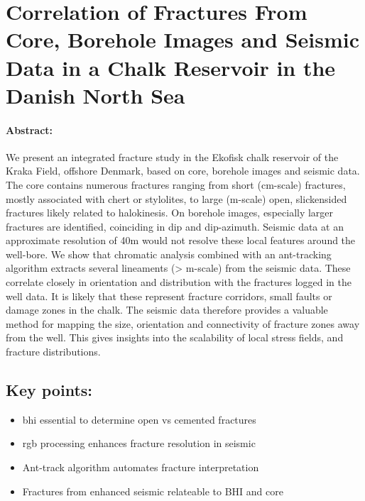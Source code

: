 \section{Correlation of Fractures From Core, Borehole Images and Seismic Data in a Chalk Reservoir in the Danish North Sea}
\label{sec:talaEAGE}
\paragraph{Abstract:} We present an integrated fracture study in the Ekofisk chalk reservoir of the Kraka Field, offshore Denmark, based on core, borehole images and seismic data. The core contains numerous fractures ranging from short (cm-scale) fractures, mostly associated with chert or stylolites, to large (m-scale) open, slickensided fractures likely related to halokinesis. On borehole images, especially larger fractures are identified, coinciding in dip and dip-azimuth. Seismic data at an approximate resolution of 40m would not resolve these local features around the well-bore. We show that chromatic analysis combined with an ant-tracking algorithm extracts several lineaments (> m-scale) from the seismic data. These correlate closely in orientation and distribution with the fractures logged in the well data. It is likely that these represent fracture corridors, small faults or damage zones in the chalk. The seismic data therefore provides a valuable method for mapping the size, orientation and connectivity of fracture zones away from the well. This gives insights into the scalability of local stress fields, and fracture distributions.
\vfill
\subsection*{Key points:}
\begin{itemize}
    \item \acf{bhi} essential to determine open vs cemented fractures
    \item \acf{rgb} processing enhances fracture resolution in seismic
    \item Ant-track algorithm automates fracture interpretation
    \item Fractures from enhanced seismic relateable to BHI and core
\end{itemize}
\vfill

{\vfill\hfill\newline{}}

